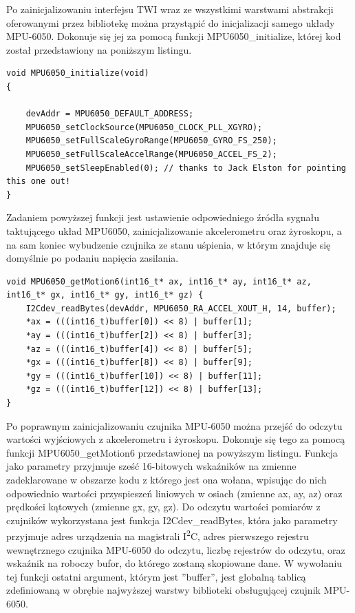 Po zainicjalizowaniu interfejsu TWI wraz ze wszystkimi warstwami abstrakcji oferowanymi przez bibliotekę można przystąpić do inicjalizacji samego układy MPU-6050. Dokonuje się jej za pomocą funkcji MPU6050\_initialize, której kod został przedstawiony na poniższym listingu.

\begin{lstlisting}
void MPU6050_initialize(void) 
{
	
	devAddr = MPU6050_DEFAULT_ADDRESS;
    MPU6050_setClockSource(MPU6050_CLOCK_PLL_XGYRO);
    MPU6050_setFullScaleGyroRange(MPU6050_GYRO_FS_250);
    MPU6050_setFullScaleAccelRange(MPU6050_ACCEL_FS_2);
    MPU6050_setSleepEnabled(0); // thanks to Jack Elston for pointing this one out!
}
\end{lstlisting}

Zadaniem powyższej funkcji jest ustawienie odpowiedniego źródła sygnału taktującego układ MPU6050, zainicjalizowanie akcelerometru oraz żyroskopu, a na sam koniec wybudzenie czujnika ze stanu uśpienia, w którym znajduje się domyślnie po podaniu napięcia zasilania.

\begin{lstlisting}
void MPU6050_getMotion6(int16_t* ax, int16_t* ay, int16_t* az, int16_t* gx, int16_t* gy, int16_t* gz) {
    I2Cdev_readBytes(devAddr, MPU6050_RA_ACCEL_XOUT_H, 14, buffer);
    *ax = (((int16_t)buffer[0]) << 8) | buffer[1];
    *ay = (((int16_t)buffer[2]) << 8) | buffer[3];
    *az = (((int16_t)buffer[4]) << 8) | buffer[5];
    *gx = (((int16_t)buffer[8]) << 8) | buffer[9];
    *gy = (((int16_t)buffer[10]) << 8) | buffer[11];
    *gz = (((int16_t)buffer[12]) << 8) | buffer[13];
}
\end{lstlisting}

Po poprawnym zainicjalizowaniu czujnika MPU-6050 można przejść do odczytu wartości wyjściowych z akcelerometru i żyroskopu. Dokonuje się tego za pomocą funkcji MPU6050\_getMotion6 przedstawionej na powyższym listingu. Funkcja jako parametry przyjmuje sześć 16-bitowych wskaźników na zmienne zadeklarowane w obszarze kodu z którego jest ona wołana, wpisując do nich odpowiednio wartości przyspieszeń liniowych w osiach (zmienne ax, ay, az) oraz prędkości kątowych (zmienne gx, gy, gz). Do odczytu wartości pomiarów z czujników wykorzystana jest funkcja I2Cdev\_readBytes, która jako parametry przyjmuje adres urządzenia na magistrali I\textsuperscript{2}C, adres pierwszego rejestru wewnętrznego czujnika MPU-6050 do odczytu, liczbę rejestrów do odczytu, oraz wskaźnik na roboczy bufor, do którego zostaną skopiowane dane. W wywołaniu tej funkcji ostatni argument, którym jest ''buffer'', jest globalną tablicą zdefiniowaną w obrębie najwyższej warstwy biblioteki obsługującej czujnik MPU-6050.

